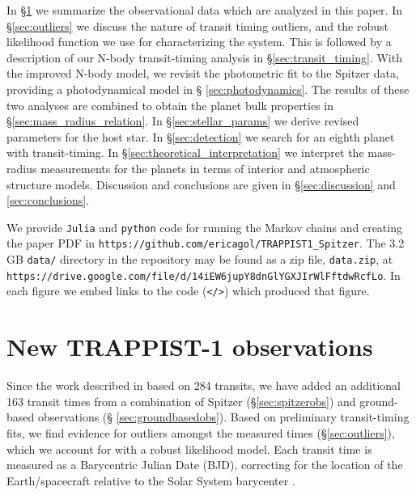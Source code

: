 \documentclass[twocolumn]{aastex63}
\begin{document}
In \S \ref{sec:observations} we summarize the observational data which are analyzed
in this paper.  In \S \ref{sec:outliers} we discuss the nature of transit
timing outliers, and the robust likelihood function we use for characterizing the
system.  This is followed by a description of our N-body transit-timing analysis
in \S \ref{sec:transit_timing}.  With the improved N-body model, we revisit the
photometric fit to the Spitzer data, providing a photodynamical model in \S
\ref{sec:photodynamics}.  The results of these two analyses are combined to
obtain the planet bulk properties in \S \ref{sec:mass_radius_relation}.  In \S \ref{sec:stellar_params} we derive revised parameters for the host star.  In \S \ref{sec:detection} we search for an eighth planet with transit-timing.  In \S \ref{sec:theoretical_interpretation} we interpret the mass-radius measurements for the planets in terms of interior and atmospheric structure models.  Discussion and conclusions
are given in \S \ref{sec:discussion} and \ref{sec:conclusions}.

We provide \texttt{Julia} and \texttt{python} code for running the Markov chains 
and creating the paper PDF in
\texttt{https://github.com/ericagol/TRAPPIST1\_Spitzer}.  
The 3.2 GB \texttt{data/} directory in the repository may be found as a
zip file, \texttt{data.zip}, at 
\texttt{\scriptsize https://drive.google.com/file/d/14iEW6jupY8dnGlYGXJIrWlFftdwRcfLo}.
In each figure we embed links to the code (\texttt{</>}) which produced that figure.

\section{New TRAPPIST-1 observations} \label{sec:observations}

Since the work described in \citet{Grimm2018} based on 284 transits, we
have added an additional 163 transit times from a combination of Spitzer
(\S \ref{sec:spitzerobs}) and ground-based observations (\S
\ref{sec:groundbasedobs}).  Based on preliminary transit-timing
fits, we find evidence for outliers amongst the measured times
(\S \ref{sec:outliers}), which we account for with a robust likelihood
model.  Each transit time is measured as a Barycentric Julian Date (BJD), correcting for the location of the Earth/spacecraft relative to the Solar System barycenter \citep{Eastman2010}.

\end{document}
